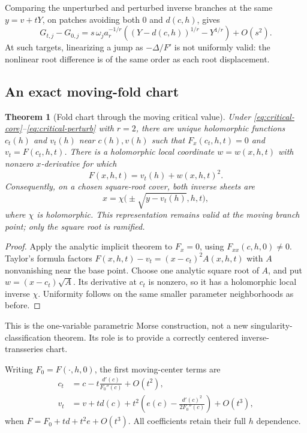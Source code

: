 \documentclass[11pt,a4paper]{article}
\numberwithin{equation}{section}
\newtheorem{theorem}{Theorem}[section]
\theoremstyle{definition}
\theoremstyle{remark}\newtheorem{remark}[theorem]{Remark}
\begin{document}
Comparing the unperturbed and perturbed inverse branches at the same
$y=v+tY$, on patches avoiding both $0$ and $d(c,h)$, gives
\begin{equation}\label{eq:critical-jump}
 G_{t,j}-G_{0,j}
 =s\,\omega_j a_r^{-1/r}
 \left((Y-d(c,h))^{1/r}-Y^{1/r}\right)+O(s^2).
\end{equation}
At such targets, linearizing a jump as $-\Delta/F'$ is not uniformly
valid: the nonlinear root difference is of the same order as each
root displacement.

\subsection{An exact moving-fold chart}
\begin{theorem}[Fold chart through the moving critical value]
\label{thm:morse}
Under \eqref{eq:critical-core}--\eqref{eq:critical-perturb} with $r=2$,
there are unique holomorphic functions $c_t(h)$ and $v_t(h)$ near
$c(h),v(h)$ such that $F_x(c_t,h,t)=0$ and $v_t=F(c_t,h,t)$.
There is a holomorphic local coordinate $w=w(x,h,t)$ with nonzero
$x$-derivative for which
\begin{equation}\label{eq:morse}
 F(x,h,t)=v_t(h)+w(x,h,t)^2.
\end{equation}
Consequently, on a chosen square-root cover, both inverse sheets are
\begin{equation}\label{eq:fold-exact}
 x=\chi\bigl(\pm\sqrt{y-v_t(h)},h,t\bigr),
\end{equation}
where $\chi$ is holomorphic. This representation remains valid at the
moving branch point; only the square root is ramified.
\end{theorem}
\begin{proof}
Apply the analytic implicit theorem to $F_x=0$, using $F_{xx}(c,h,0)\ne0$.
Taylor's formula factors
$F(x,h,t)-v_t=(x-c_t)^2 A(x,h,t)$ with $A$ nonvanishing near the base
point. Choose one analytic square root of $A$, and put
$w=(x-c_t)\sqrt A$. Its derivative at $c_t$ is nonzero, so it has a
holomorphic local inverse $\chi$. Uniformity follows on the same smaller
parameter neighborhoods as before.
\end{proof}
This is the one-variable parametric Morse construction, not a new
singularity-classification theorem. Its role is to provide a correctly
centered inverse-transseries chart.

Writing $F_0=F(\cdot,h,0)$, the first moving-center terms are
\begin{align}
 c_t&=c-t\frac{d'(c)}{F_0''(c)}+O(t^2),\label{eq:center-shift}\\
 v_t&=v+t d(c)+t^2\left(e(c)-\frac{d'(c)^2}{2F_0''(c)}\right)+O(t^3),
 \label{eq:value-shift}
\end{align}
when $F=F_0+t d+t^2e+O(t^3)$. All coefficients retain their full $h$
dependence.
\end{document}

